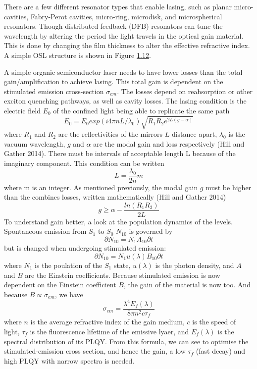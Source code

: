 \documentclass[
  letterpaper,
  DIV=11,
  numbers=noendperiod,
  oneside]{scrreprt}
\begin{document}
There are a few different resonator types that enable lasing, such as
planar micro-cavities, Fabry-Perot cavities, micro-ring, microdisk, and
microspherical resonators. Though distributed feedback (DFB) resonators
can tune the wavelength by altering the period the light travels in the
optical gain material. This is done by changing the film thickness to
alter the effective refractive index. A simple OSL structure is shown in
Figure \protect\hyperlink{imagesux2flaseramp}{1.12}.

A simple organic semiconductor laser needs to have lower losses than the
total gain/amplification to achieve lasing. This total gain is dependent
on the stimulated emission cross-section \(\sigma_{em}\). The losses
depend on reabsorption or other exciton quenching pathways, as well as
cavity losses. The lasing condition is the electric field \(E_0\) of the
confined light being able to replicate the same path
\[E_0 = E_0 exp(i4\pi nL/\lambda_0)\sqrt{R_1R_2e^{2L(g-\alpha)}}\] where
\(R_1\) and \(R_2\) are the reflectivities of the mirrors \(L\) distance
apart, \(\lambda_0\) is the vacuum wavelength, \(g\) and \(\alpha\) are
the modal gain and loss respectively (Hill and Gather 2014). There must
be intervals of acceptable length L because of the imaginary component.
This condition can be written \[L = \frac{\lambda_0}{2n}m\] where m is
an integer. As mentioned previously, the modal gain \(g\) must be higher
than the combines losses, written mathematically (Hill and Gather 2014)
\[g \geq \alpha - \frac{ln(R_1R_2)}{2L}\] To understand gain better, a
look at the population dynamics of the levels. Spontaneous emission from
\(S_1\) to \(S_0\) \(N_{10}\) is governed by
\[\partial N_{10} = N_1A_{10}\partial t\] but is changed when undergoing
stimulated emission: \[\partial N_{10} = N_1u(\lambda)B_{10}\partial t\]
where \(N_1\) is the poulation of the \(S_1\) state, \(u(\lambda)\) is
the photon density, and \(A\) and \(B\) are the Einstein coefficients.
Because stimulated emission is now dependent on the Einstein coefficient
\(B\), the gain of the material is now too. And because
\(B \propto \sigma_{em}\), we have
\[\sigma_{em} = \frac{\lambda^4E_f(\lambda)}{8\pi n^2c\tau_f}\] where
\(n\) is the average refractive index of the gain medium, \(c\) is the
speed of light, \(\tau_f\) is the fluorescence lifetime of the emissive
lyaer, and \(E_f(\lambda)\) is the spectral distribution of its PLQY.
From this formula, we can see to optimise the stimulated-emission cross
section, and hence the gain, a low \(\tau_f\) (fast decay) and high PLQY
with narrow spectra is needed.
\end{document}
